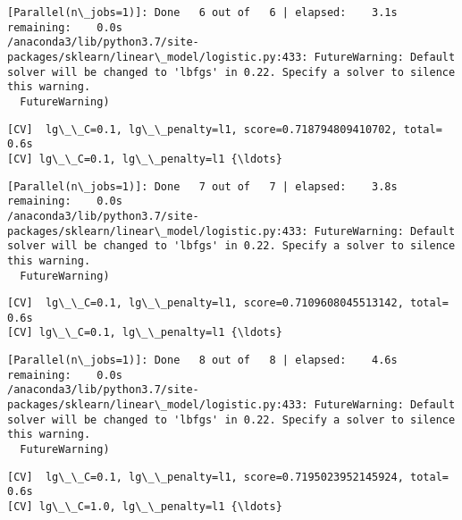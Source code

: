 \documentclass[11pt]{article}
\begin{document}
    \begin{Verbatim}[commandchars=\\\{\}]
[Parallel(n\_jobs=1)]: Done   6 out of   6 | elapsed:    3.1s remaining:    0.0s
/anaconda3/lib/python3.7/site-packages/sklearn/linear\_model/logistic.py:433: FutureWarning: Default solver will be changed to 'lbfgs' in 0.22. Specify a solver to silence this warning.
  FutureWarning)

    \end{Verbatim}

    \begin{Verbatim}[commandchars=\\\{\}]
[CV]  lg\_\_C=0.1, lg\_\_penalty=l1, score=0.718794809410702, total=   0.6s
[CV] lg\_\_C=0.1, lg\_\_penalty=l1 {\ldots}

    \end{Verbatim}

    \begin{Verbatim}[commandchars=\\\{\}]
[Parallel(n\_jobs=1)]: Done   7 out of   7 | elapsed:    3.8s remaining:    0.0s
/anaconda3/lib/python3.7/site-packages/sklearn/linear\_model/logistic.py:433: FutureWarning: Default solver will be changed to 'lbfgs' in 0.22. Specify a solver to silence this warning.
  FutureWarning)

    \end{Verbatim}

    \begin{Verbatim}[commandchars=\\\{\}]
[CV]  lg\_\_C=0.1, lg\_\_penalty=l1, score=0.7109608045513142, total=   0.6s
[CV] lg\_\_C=0.1, lg\_\_penalty=l1 {\ldots}

    \end{Verbatim}

    \begin{Verbatim}[commandchars=\\\{\}]
[Parallel(n\_jobs=1)]: Done   8 out of   8 | elapsed:    4.6s remaining:    0.0s
/anaconda3/lib/python3.7/site-packages/sklearn/linear\_model/logistic.py:433: FutureWarning: Default solver will be changed to 'lbfgs' in 0.22. Specify a solver to silence this warning.
  FutureWarning)

    \end{Verbatim}

    \begin{Verbatim}[commandchars=\\\{\}]
[CV]  lg\_\_C=0.1, lg\_\_penalty=l1, score=0.7195023952145924, total=   0.6s
[CV] lg\_\_C=1.0, lg\_\_penalty=l1 {\ldots}

    \end{Verbatim}
\end{document}
